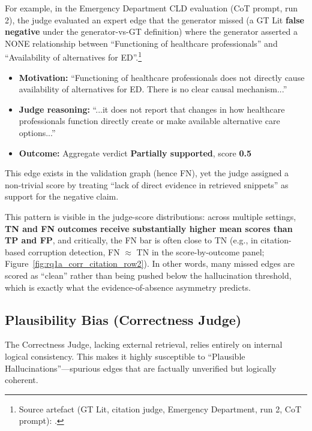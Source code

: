 For example, in the Emergency Department CLD evaluation (CoT prompt, run 2), the judge evaluated an expert edge that the generator missed (a GT Lit \textbf{false negative} under the generator-vs-GT definition) where the generator asserted a NONE relationship between ``Functioning of healthcare professionals'' and ``Availability of alternatives for ED''.\footnote{Source artefact (GT Lit, citation judge, Emergency Department, run 2, CoT prompt): .}%
\begin{itemize}[noitemsep]
    \item \textbf{Motivation:} ``Functioning of healthcare professionals does not directly cause availability of alternatives for ED. There is no clear causal mechanism...''
    \item \textbf{Judge reasoning:} ``...it does not report that changes in how healthcare professionals function directly create or make available alternative care options...''
    \item \textbf{Outcome:} Aggregate verdict \textbf{Partially supported}, score \textbf{0.5}
\end{itemize}

This edge exists in the validation graph (hence FN), yet the judge assigned a non-trivial score by treating ``lack of direct evidence in retrieved snippets'' as support for the negative claim.

This pattern is visible in the judge-score distributions: across multiple settings, \textbf{TN and FN outcomes receive substantially higher mean scores than TP and FP}, and critically, the FN bar is often close to TN (e.g., in citation-based corruption detection, FN $\approx$ TN in the score-by-outcome panel; Figure~\ref{fig:rq1a_corr_citation_row2}). In other words, many missed edges are scored as ``clean'' rather than being pushed below the hallucination threshold, which is exactly what the evidence-of-absence asymmetry predicts.

\subsection{Plausibility Bias (Correctness Judge)}

The Correctness Judge, lacking external retrieval, relies entirely on internal logical consistency. This makes it highly susceptible to ``Plausible Hallucinations''---spurious edges that are factually unverified but logically coherent.

